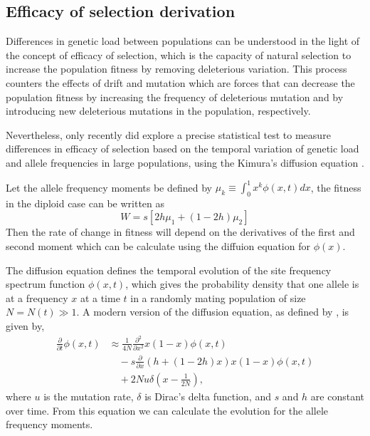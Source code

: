 \documentclass[a4paper, 12pt]{article}
\begin{document}
\subsection{Efficacy of selection derivation}
\label{sec:fit}

Differences in genetic load between populations can be understood in the light
of the concept of efficacy of selection, which is the capacity of natural
selection to increase the population fitness by removing deleterious variation.
This process counters the effects of drift and mutation which are forces that
can decrease the population fitness by increasing the frequency of deleterious
mutation and by introducing new deleterious mutations in the population,
respectively.

Nevertheless, only recently did \cite{Gravel2016} explore a precise
statistical test to measure differences in efficacy of selection based on the
temporal variation of genetic load and allele frequencies in large populations,
using the Kimura's diffusion equation \citep{Kimura1955,Kimura1955a}. 

Let the allele frequency moments be defined by $\mu_k \equiv \int_{0}^{1}x^k
\phi(x,t)dx$, the fitness in the diploid case can be written as 
\begin{equation}
  W = s[2h\mu_1 + (1 - 2h)\mu_2]
\end{equation} 
Then the rate of change in fitness will depend on the derivatives of the first
and second moment which can be calculate using the diffuion equation for
$\phi(x)$.  

The diffusion equation defines the temporal evolution of the site frequency
spectrum function $\phi(x,t)$, which gives the probability density that one
allele is at a frequency $x$ at a time $t$ in a randomly mating population of
size $N = N(t) \gg 1$. A modern version of the diffusion equation, as defined
by \cite{Ewens2004}, is given by,
\begin{align}
\label{eq:difeq}
\frac{\partial}{\partial t} \phi(x,t) & \approx 
\frac{1}{4N}\frac{\partial^2}{\partial x^2} 
x (1 - x) \phi(x,t) \\ \nonumber
& \quad -s\frac{\partial}{\partial x} 
(h + (1 - 2 h)x)
x (1 - x) \phi(x,t) \\ \nonumber
& \quad + 2 N u \delta(x - \frac{1}{2N}),
\end{align}
where $u$ is the mutation rate, $\delta$ is Dirac's delta function, and $s$
and $h$ are constant over time. From this equation we can calculate the
evolution for the allele frequency moments.
\end{document}
